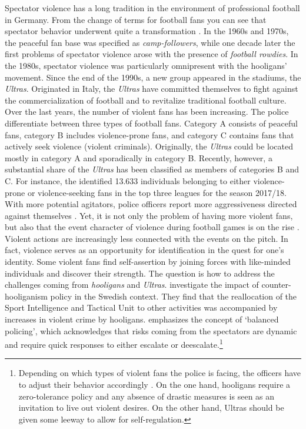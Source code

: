 Spectator violence has a long tradition in the environment of professional football in Germany. From the change of terms for football fans you can see that spectator behavior underwent quite a transformation \citep{pilz2005kuttenfan}. In the 1960s and 1970s, the peaceful fan base was specified as \textit{camp-followers}, while one decade later the first problems of spectator violence arose with the presence of \textit{football rowdies}. In the 1980s, spectator violence was particularly omnipresent with the hooligans' movement. Since the end of the 1990s, a new group appeared in the stadiums, the \textit{Ultras}. Originated in Italy, the \textit{Ultras} have committed themselves to fight against the commercialization of football and to revitalize traditional football culture. Over the last years, the number of violent fans has been increasing. The police differentiate between three types of football fans. Category A consists of peaceful fans, category B includes violence-prone fans, and category C contains fans that actively seek violence (violent criminals). Originally, the \textit{Ultras} could be located mostly in category A and sporadically in category B. Recently, however, a substantial share of the \textit{Ultras} has been classified as members of categories B and C. For instance, the \cite{zis17_18} identified 13.633 individuals belonging to either violence-prone or violence-seeking fans in the top three leagues for the season 2017/18. With more potential agitators, police officers report more aggressiveness directed against themselves \citep{feltes2010fussballgewalt}. Yet, it is not only the problem of having more violent fans, but also that the event character of violence during football games is on the rise \citep{pilz2005kuttenfan}. Violent actions are increasingly less connected with the events on the pitch. In fact, violence serves as an opportunity for identification in the quest for one's identity. Some violent fans find self-assertion by joining forces with like-minded individuals and discover their strength. The question is how to address the challenges coming from \textit{hooligans} and \textit{Ultras}. \cite{poutvaara2009police} investigate the impact of counter-hooliganism policy in the Swedish context. They find that the reallocation of the Sport Intelligence and Tactical Unit to other activities was accompanied by increases in violent crime by hooligans. \cite{feltes2010fussballgewalt} emphasizes the concept of `balanced policing', which acknowledges that risks coming from the spectators are dynamic and require quick responses to either escalate or deescalate.\footnote{Depending on which types of violent fans the police is facing, the officers have to adjust their behavior accordingly \citep{feltes2010fussballgewalt}. On the one hand, hooligans require a zero-tolerance policy and any absence of drastic measures is seen as an invitation to live out violent desires. On the other hand, Ultras should be given some leeway to allow for self-regulation.} 



